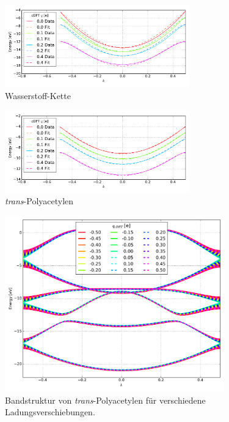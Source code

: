 \begin{frame}
\begin{figure}
\centering
\includegraphics[width = 8cm]{Images/Hydrogen/charging/3D_cuts}
\caption{Wasserstoff-Kette}
\label{image_hydrogen_3D_slices}
\end{figure}
\vspace*{-.7cm}
\begin{figure}
\centering
\includegraphics[width = 8cm]{Images/polyacetylene/charging/3D_cuts}
\caption{\emph{trans}-Polyacetylen}
\end{figure}
\end{frame}

\begin{frame}
\begin{figure}
	\centering
	\includegraphics[width = 9.5cm]{Images/polyacetylene/charging/band_structure_q_1}
	\caption{Bandstruktur von \emph{trans}-Polyacetylen für verschiedene Ladungsverschiebungen.}
	\label{image_polyacetylene_band_structure_charging}
\end{figure}
\end{frame}

